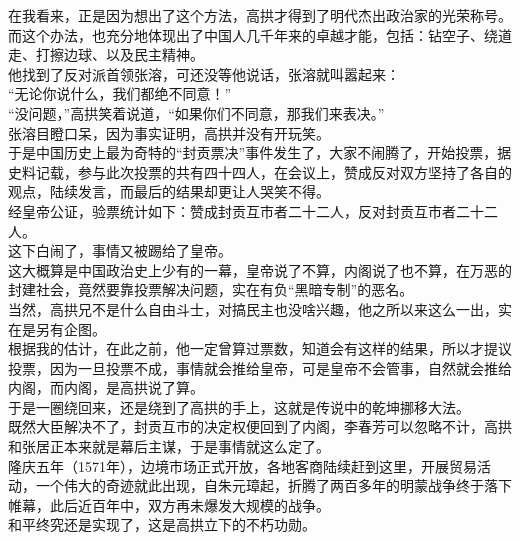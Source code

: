 \begin{multicols}{\theparacolNo}
在我看来，正是因为想出了这个方法，高拱才得到了明代杰出政治家的光荣称号。而这个办法，也充分地体现出了中国人几千年来的卓越才能，包括：钻空子、绕道走、打擦边球、以及民主精神。\\

他找到了反对派首领张溶，可还没等他说话，张溶就叫嚣起来：\\

“无论你说什么，我们都绝不同意！”\\

“没问题，”高拱笑着说道，“如果你们不同意，那我们来表决。”\\

张溶目瞪口呆，因为事实证明，高拱并没有开玩笑。\\

于是中国历史上最为奇特的“封贡票决”事件发生了，大家不闹腾了，开始投票，据史料记载，参与此次投票的共有四十四人，在会议上，赞成反对双方坚持了各自的观点，陆续发言，而最后的结果却更让人哭笑不得。\\

经皇帝公证，验票统计如下：赞成封贡互市者二十二人，反对封贡互市者二十二人。\\

这下白闹了，事情又被踢给了皇帝。\\

这大概算是中国政治史上少有的一幕，皇帝说了不算，内阁说了也不算，在万恶的封建社会，竟然要靠投票解决问题，实在有负“黑暗专制”的恶名。\\

当然，高拱兄不是什么自由斗士，对搞民主也没啥兴趣，他之所以来这么一出，实在是另有企图。\\

根据我的估计，在此之前，他一定曾算过票数，知道会有这样的结果，所以才提议投票，因为一旦投票不成，事情就会推给皇帝，可是皇帝不会管事，自然就会推给内阁，而内阁，是高拱说了算。\\

于是一圈绕回来，还是绕到了高拱的手上，这就是传说中的乾坤挪移大法。\\

既然大臣解决不了，封贡互市的决定权便回到了内阁，李春芳可以忽略不计，高拱和张居正本来就是幕后主谋，于是事情就这么定了。\\

隆庆五年（1571年），边境市场正式开放，各地客商陆续赶到这里，开展贸易活动，一个伟大的奇迹就此出现，自朱元璋起，折腾了两百多年的明蒙战争终于落下帷幕，此后近百年中，双方再未爆发大规模的战争。\\

和平终究还是实现了，这是高拱立下的不朽功勋。\\

\ifnum{}
	\end{multicols}
\fi
\newpage
